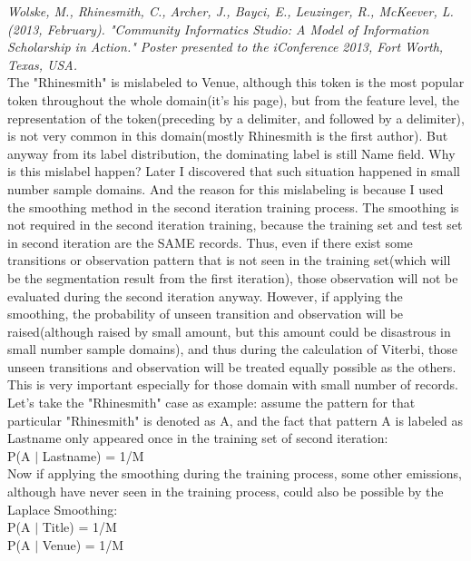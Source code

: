 \documentclass[11pt]{article}
\begin{document}
\textit{Wolske, M., Rhinesmith, C., Archer, J., Bayci, E., Leuzinger, R., McKeever, L. (2013, February). "Community Informatics Studio: A Model of Information Scholarship in Action." Poster presented to the iConference 2013, Fort Worth, Texas, USA.}\\

The "Rhinesmith" is mislabeled to Venue, although this token is the most popular token throughout the whole domain(it's his page), but from the feature level, the representation of the token(preceding by a delimiter, and followed by a delimiter), is not very common in this domain(mostly Rhinesmith is the first author). But anyway from its label distribution, the dominating label is still Name field. Why is this mislabel happen? Later I discovered that such situation happened in small number sample domains. And the reason for this mislabeling is because I used the smoothing method in the second iteration training process. The smoothing is not required in the second iteration training, because the training set and test set in second iteration are the SAME records. Thus, even if there exist some transitions or observation pattern that is not seen in the training set(which will be the segmentation result from the first iteration), those observation will not be evaluated during the second iteration anyway. However, if applying the smoothing, the probability of unseen transition and observation will be raised(although raised by small amount, but this amount could be disastrous in small number sample domains), and thus during the calculation of Viterbi, those unseen transitions and observation will be treated equally possible as the others. This is very important especially for those domain with small number of records. Let's take the "Rhinesmith" case as example: assume the pattern for that particular "Rhinesmith" is denoted as A, and the fact that pattern A is labeled as Lastname only appeared once in the training set of second iteration:\\

P(A $\vert$ Lastname) = 1/M\\

Now if applying the smoothing during the training process, some other emissions, although have never seen in the training process, could also be possible by the Laplace Smoothing:\\

P(A $\vert$ Title) = 1/M\\

P(A $\vert$ Venue) = 1/M\\
\end{document}
